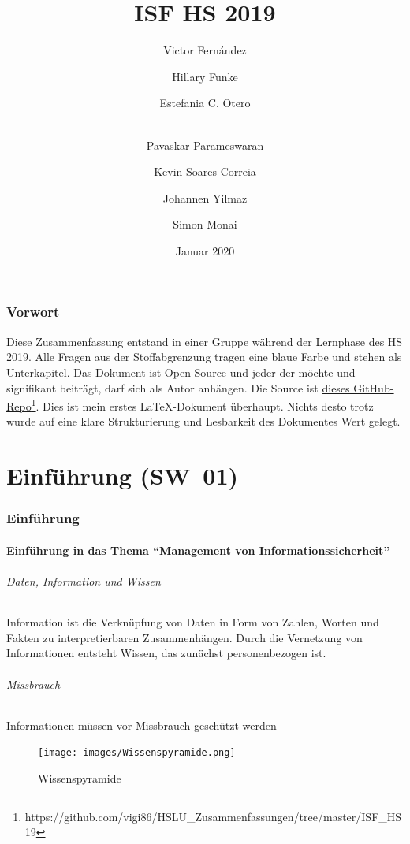 \documentclass[10pt,a4paper]{article}
\title{ISF HS 2019}
\author[1]{Victor Fernández}
\author[2]{Hillary Funke}
\author[2]{Estefania C. Otero}
\author[3]{\\Pavaskar Parameswaran}
\author[3]{Kevin Soares Correia}
\author[2]{Johannen Yilmaz}
\author[2]{Simon Monai}
\affil[1]{HSLU Informatik}
\affil[2]{HSLU Information and Cyber Security}
\affil[3]{HSLU Wirtschaftsinformatik}
\date{Januar 2020}
\begin{document}
\maketitle
\thispagestyle{empty}
\section*{Vorwort}Diese Zusammenfassung entstand in einer Gruppe während der Lernphase des HS 2019. Alle Fragen aus der Stoffabgrenzung tragen eine {\color{dunkelblau}blaue Farbe} und stehen als Unterkapitel. Das Dokument ist Open Source und jeder der möchte und signifikant beiträgt, darf sich als Autor anhängen. Die Source ist \underline{\href{https://github.com/vigi86/HSLU_Zusammenfassungen/tree/master/ISF_HS19}{dieses GitHub-Repo}}\footnote{https://github.com/vigi86/HSLU\_Zusammenfassungen/tree/master/ISF\_HS19}. Dies ist mein erstes \LaTeX{}-Dokument überhaupt. Nichts desto trotz wurde auf eine klare Strukturierung und Lesbarkeit des Dokumentes Wert gelegt.
\tableofcontents
\thispagestyle{empty}
\pagebreak


\part{Einführung (SW~01)}

\section{Einführung}

\subsection*{Einführung in das Thema "`Management von Informationssicherheit"'}

\paragraph*{Daten, Information und Wissen}Information ist die Verknüpfung von Daten in Form von Zahlen, Worten und Fakten zu interpretierbaren Zusammenhängen. Durch die Vernetzung von Informationen entsteht Wissen, das zunächst personenbezogen ist.

\paragraph*{Missbrauch}Informationen müssen vor Missbrauch geschützt werden
\begin{figure}[H]
    \begin{center}
    \texttt{[image: images/Wissenspyramide.png]}
    \caption{Wissenspyramide\cite{wiki}}
    \label{Wissenspyramide}
    \end{center}
\end{figure}
\end{document}
